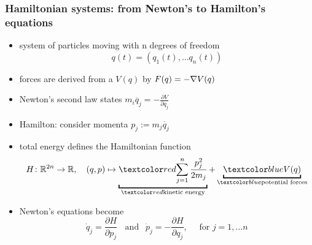 \begin{frame}
  \frametitle{Hamiltonian systems: from Newton's to Hamilton's equations}
  \begin{itemize}
    \item system of particles moving with n degrees of freedom %
    \[ q(t) = (q_1(t),\dots q_n(t)) \]
    \item {}
    forces are derived from a  $V(q)$ by $F(q)= -\nabla V(q)$
    \item Newton's second law states $m_i \ddot{q_j} = - \frac{\partial V}{\partial q_j}$
    \pause

    \item Hamilton: consider momenta $p_j := m_j \dot{q_j}$
    \item total energy defines the Hamiltonian function
    \[ H\colon \R^{2n}\to\R,\quad (q,p)\mapsto \mymark{red}{\sum_{j=1}^n \frac{p_j^2}{2 m_j}}{kinetic energy} + \mymark{blue}{V(q)}{potential forces} \]
    \vspace{-\baselineskip}
    \item Newton's equations become 
    \begin{equation*} \dot{q}_j = \frac{\partial H}{\partial p_j} \;\;\text{ and }\;\,\dot{p}_j = -\frac{\partial H}{\partial q_j}, \quad \text{ for }j=1,\dots n \tag{H}\end{equation*}
  \end{itemize}
\end{frame}

